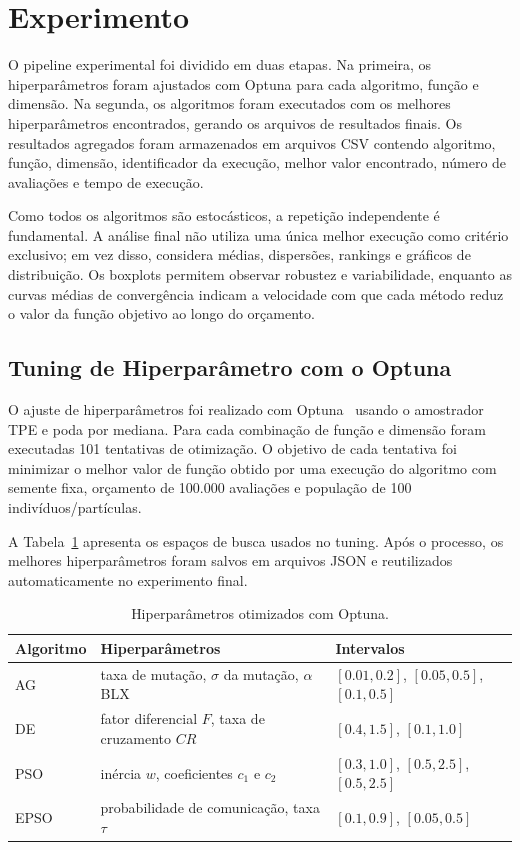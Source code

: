 \documentclass[runningheads]{llncs}
\begin{document}
\section{Experimento}

O pipeline experimental foi dividido em duas etapas. Na primeira, os hiperparâmetros foram ajustados com Optuna para cada algoritmo, função e dimensão. Na segunda, os algoritmos foram executados com os melhores hiperparâmetros encontrados, gerando os arquivos de resultados finais. Os resultados agregados foram armazenados em arquivos CSV contendo algoritmo, função, dimensão, identificador da execução, melhor valor encontrado, número de avaliações e tempo de execução.

Como todos os algoritmos são estocásticos, a repetição independente é fundamental. A análise final não utiliza uma única melhor execução como critério exclusivo; em vez disso, considera médias, dispersões, rankings e gráficos de distribuição. Os boxplots permitem observar robustez e variabilidade, enquanto as curvas médias de convergência indicam a velocidade com que cada método reduz o valor da função objetivo ao longo do orçamento.

\subsection{Tuning de Hiperparâmetro com o Optuna}

O ajuste de hiperparâmetros foi realizado com Optuna~\cite{akiba2019optuna} usando o amostrador TPE e poda por mediana. Para cada combinação de função e dimensão foram executadas 101 tentativas de otimização. O objetivo de cada tentativa foi minimizar o melhor valor de função obtido por uma execução do algoritmo com semente fixa, orçamento de 100.000 avaliações e população de 100 indivíduos/partículas.

A Tabela~\ref{tab:hparams} apresenta os espaços de busca usados no tuning. Após o processo, os melhores hiperparâmetros foram salvos em arquivos JSON e reutilizados automaticamente no experimento final.

\begin{table}
\centering
\caption{Hiperparâmetros otimizados com Optuna.}
\label{tab:hparams}
\begin{tabular}{lll}
\toprule
Algoritmo & Hiperparâmetros & Intervalos \\
\midrule
AG & taxa de mutação, $\sigma$ da mutação, $\alpha$ BLX & $[0.01,0.2]$, $[0.05,0.5]$, $[0.1,0.5]$ \\
DE & fator diferencial $F$, taxa de cruzamento $CR$ & $[0.4,1.5]$, $[0.1,1.0]$ \\
PSO & inércia $w$, coeficientes $c_1$ e $c_2$ & $[0.3,1.0]$, $[0.5,2.5]$, $[0.5,2.5]$ \\
EPSO & probabilidade de comunicação, taxa $\tau$ & $[0.1,0.9]$, $[0.05,0.5]$ \\
\bottomrule
\end{tabular}
\end{table}
\end{document}
